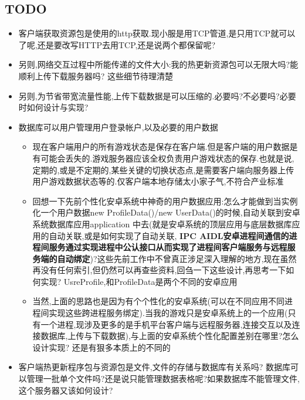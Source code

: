 \documentclass[9pt, b5paper]{article}
\begin{document}
\subsection{{\bfseries\sffamily TODO} }
\label{sec-4-1}
\begin{itemize}
\item 客户端获取资源包是使用的http获取.现小服是用TCP管道,是只用TCP就可以了呢,还是要改写HTTP去用TCP,还是说两个都保留呢?
\item 另则,网络交互过程中所能传递的文件大小:我的热更新资源包可以无限大吗?能顺利上传下载服务器吗? 这些细节待理清楚
\item 另则,为节省带宽流量性能,上传下载数据是可以压缩的.必要吗?不必要吗?必要时如何设计与实现?
\item 数据库可以用户管理用户登录帐户,以及必要的用户数据
\begin{itemize}
\item 现在客户端用户的所有游戏状态是保存在客户端.但是客户端的用户数据是有可能会丢失的.游戏服务器应该全权负责用户游戏状态的保存.也就是说,定期的,或是不定期的,某些关键的切换状态点,是需要客户端向服务器上传用户游戏数据状态等的.仅客户端本地存储太小家子气,不符合产业标准
\item 回想一下先前个性化安卓系统中神奇的用户数据应用:怎么才能做到当实例化一个用户数据new ProfileData()/new UserData()的时候,自动关联到安卓系统数据库应用application 中去(就是安卓系统的顶层应用与底层数据库应用的自动关联,或是如何实现了自动关联, \textbf{IPC AIDL安卓进程间通信的进程间服务通过实现进程中公认接口从而实现了进程间客户端服务与远程服务端的自动绑定})?这些先前工作中不曾真正涉足深入理解的地方,现在虽然再没有任何索引,但仍然可以再查些资料,回刍一下这些设计,再思考一下如何实现? UsreProfile,和ProfileData是两个不同的安卓应用
\item 当然,上面的思路也是因为有个个性化的安卓系统(可以在不同应用不同进程间实现这些跨进程服务绑定).当我的游戏只是安卓系统上的一个应用(只有一个进程,现涉及更多的是手机平台客户端与远程服务器,连接交互以及连接数据库,上传与下载数据),与上面的安卓系统个性化配置差别在哪里?怎么设计实现? 还是有狠多本质上的不同的
\end{itemize}
\item 客户端热更新程序包与资源包是文件,文件的存储与数据库有关系吗? 数据库可以管理一批单个文件吗?还是说只能管理数据表格呢?如果数据库不能管理文件,这个服务器又该如何设计?
\end{itemize}
\end{document}
